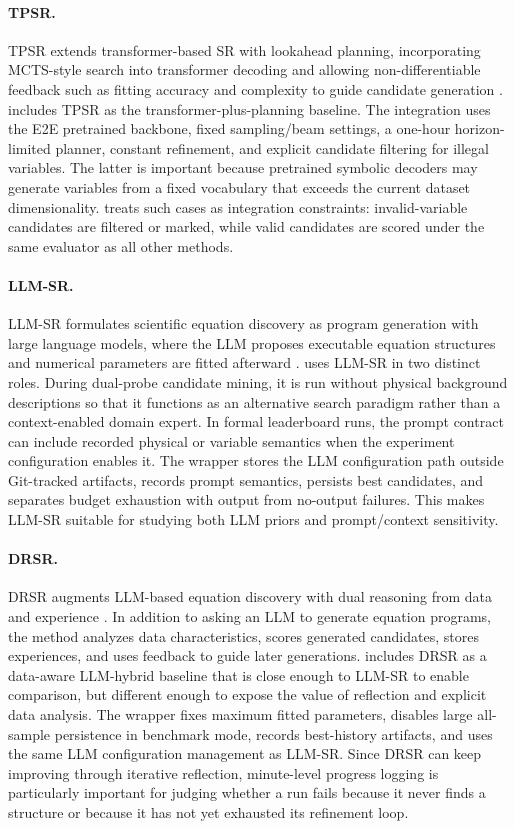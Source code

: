 \paragraph{TPSR.}
TPSR extends transformer-based SR with lookahead planning, incorporating MCTS-style search into transformer decoding and allowing non-differentiable feedback such as fitting accuracy and complexity to guide candidate generation \citep{shojaee2023tpsr}. \arena{} includes TPSR as the transformer-plus-planning baseline. The integration uses the E2E pretrained backbone, fixed sampling/beam settings, a one-hour horizon-limited planner, constant refinement, and explicit candidate filtering for illegal variables. The latter is important because pretrained symbolic decoders may generate variables from a fixed vocabulary that exceeds the current dataset dimensionality. \arena{} treats such cases as integration constraints: invalid-variable candidates are filtered or marked, while valid candidates are scored under the same evaluator as all other methods.

\paragraph{LLM-SR.}
LLM-SR formulates scientific equation discovery as program generation with large language models, where the LLM proposes executable equation structures and numerical parameters are fitted afterward \citep{shojaee2025llmsr}. \arena{} uses LLM-SR in two distinct roles. During dual-probe candidate mining, it is run without physical background descriptions so that it functions as an alternative search paradigm rather than a context-enabled domain expert. In formal leaderboard runs, the prompt contract can include recorded physical or variable semantics when the experiment configuration enables it. The wrapper stores the LLM configuration path outside Git-tracked artifacts, records prompt semantics, persists best candidates, and separates budget exhaustion with output from no-output failures. This makes LLM-SR suitable for studying both LLM priors and prompt/context sensitivity.

\paragraph{DRSR.}
DRSR augments LLM-based equation discovery with dual reasoning from data and experience \citep{wang2025drsr}. In addition to asking an LLM to generate equation programs, the method analyzes data characteristics, scores generated candidates, stores experiences, and uses feedback to guide later generations. \arena{} includes DRSR as a data-aware LLM-hybrid baseline that is close enough to LLM-SR to enable comparison, but different enough to expose the value of reflection and explicit data analysis. The wrapper fixes maximum fitted parameters, disables large all-sample persistence in benchmark mode, records best-history artifacts, and uses the same LLM configuration management as LLM-SR. Since DRSR can keep improving through iterative reflection, minute-level progress logging is particularly important for judging whether a run fails because it never finds a structure or because it has not yet exhausted its refinement loop.

